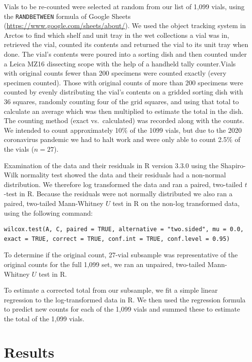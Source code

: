 \begin{multicols}{2}
Vials to be re-counted were selected at random from our list of 1,099 vials, using the \texttt{RANDBETWEEN} formula of Google Sheets (\url{https://www.google.com/sheets/about/}). We used the object tracking system in Arctos to find which shelf and unit tray in the  wet collections a vial was in, retrieved the vial, counted its contents and returned the vial to its unit tray when done. The vial’s contents were poured into a sorting dish and then counted under a Leica MZ16 dissecting scope with the help of a handheld tally counter.Vials with original counts fewer than 200 specimens were counted exactly (every specimen counted). Those with original counts of more than 200 specimens were counted by evenly distributing the vial's contents on a gridded sorting dish with 36 squares, randomly counting four of the grid squares, and using that total to calculate an average which was then multiplied to estimate the total in the dish. The counting method (exact vs.\ calculated) was recorded along with the counts. We intended to count approximately 10\% of the 1099 vials, but due to the 2020 coronavirus pandemic we had to halt work and were only able to count 2.5\% of the vials ($n=27$).
  
Examination of the data and their residuals in R version 3.3.0 \citep{RCoreTeam2016} using the Shapiro-Wilk normality test showed the data and their residuals had a non-normal distribution. We therefore log transformed the data and ran a paired, two-tailed $t$-test in R. Because the residuals were not normally distributed we also ran a paired, two-tailed Mann-Whitney $U$ test in R on the non-log transformed data, using the following command: 

\begin{Verbatim}[breaklines=true]
wilcox.test(A, C, paired = TRUE, alternative = "two.sided", mu = 0.0, exact = TRUE, correct = TRUE, conf.int = TRUE, conf.level = 0.95)
\end{Verbatim}

To determine if the original count, 27-vial subsample was representative of the original counts for the full 1,099 set, we ran an unpaired, two-tailed Mann-Whitney $U$ test in R. 

To estimate a corrected total from our subsample, we fit a simple linear regression to the log-transformed data in R. We then used the regression formula to predict new counts for each of the 1,099 vials and summed these to estimate the total of the 1,099 vials.

\section{Results} 


\end{multicols}
